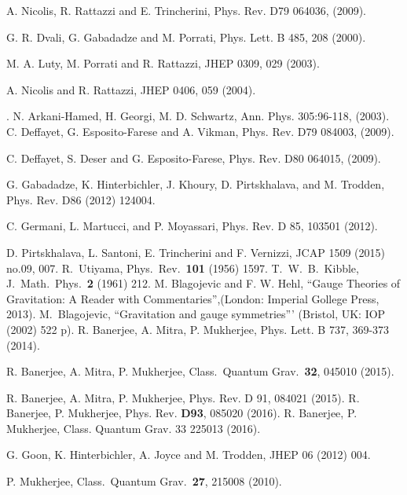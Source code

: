 \documentclass[12pt]{article}
\begin{document}
\begin{thebibliography}{999}
 A. Nicolis, R. Rattazzi and E. Trincherini, Phys. Rev. D79 064036, (2009).

G. R. Dvali, G. Gabadadze and M. Porrati, Phys. Lett. B
485, 208 (2000).

 M. A. Luty, M. Porrati and R. Rattazzi, JHEP 0309, 029 (2003).

A. Nicolis and R. Rattazzi, JHEP 0406, 059 (2004).

. 	
N. Arkani-Hamed, H. Georgi, M. D. Schwartz,
 Ann. Phys. 305:96-118, (2003).
C. Deffayet, G. Esposito-Farese and A. Vikman,
Phys. Rev. D79 084003, (2009). 

C. Deffayet, S. Deser and G. Esposito-Farese,
Phys. Rev. D80 064015, (2009).
 
  G. Gabadadze, K. Hinterbichler, J. Khoury, D. Pirtskhalava, and M. Trodden, Phys. Rev. D86 (2012) 124004.

 C. Germani, L. Martucci, and P. Moyassari,
 Phys. Rev. D 85, 103501 (2012).

D. Pirtskhalava, L. Santoni, E. Trincherini and F. Vernizzi,
JCAP 1509 (2015) no.09, 007.
  R.~Utiyama,
    Phys.\ Rev.\  {\bf 101} (1956) 1597.
  T.~W.~B.~Kibble,
    J.\ Math.\ Phys.\  {\bf 2} (1961) 212.
 M. Blagojevic and F. W. Hehl,
  ``Gauge Theories of Gravitation: A Reader with Commentaries'',{(London: Imperial Gollege Press, 2013)}. 
  M.~Blagojevic,
  ``Gravitation and gauge symmetries'''
   {(Bristol, UK: IOP (2002) 522 p)}. 
 R. Banerjee, A. Mitra, P. Mukherjee, Phys. Lett. B
737, 369-373 (2014).
 
R. Banerjee, A. Mitra, P. Mukherjee, Class.\ Quantum Grav.\ {\bf{32}}, 045010 (2015).

 R. Banerjee, A. Mitra, P. Mukherjee, Phys. Rev. D 91, 084021 (2015).
R. Banerjee, P. Mukherjee, Phys. Rev. {\bf{D93}}, 085020 (2016).
R. Banerjee, P. Mukherjee,
Class. Quantum Grav. 33 225013 (2016). 
 
 G. Goon, K. Hinterbichler, A. Joyce and M. Trodden,
 JHEP 06 (2012) 004.
 
  P. Mukherjee, Class.\ Quantum Grav.\ {\bf{27}}, 215008 (2010).


\end{thebibliography}
\end{document}
